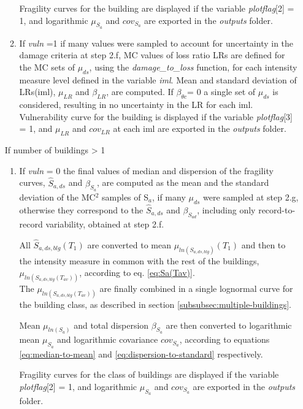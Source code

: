 \begin{enumerate}
\begin{enumerate}
Fragility curves for the building are displayed if the variable \textit{plotflag}[2] = 1, and logarithmic $\mu_{S_a}$ and $cov_{S_a}$ are exported in the \textit{outputs} folder.

\item 
If \textit{vuln} =1
if many values were sampled to account for uncertainty in the damage criteria at step 2.f, MC values of loss ratio LRs are defined for the MC sets of $\mu_{ds}$, using the \textit{damage\_to\_loss} function, for each intensity measure level defined in the variable \textit{iml}. Mean and standard deviation of LRs(iml), $\mu_{LR}$ and $\beta_{LR}$, are computed. If $\beta_{\theta c}$= 0 a single set of $\mu_{ds}$ is considered, resulting in no uncertainty in the LR for each iml.
Vulnerability curve for the building is displayed if the variable \textit{plotflag}[3] = 1, and $\mu_{LR}$ and $cov_{LR}$ at each iml are exported in the \textit{outputs} folder.\\

\end{enumerate}

If number of buildings > 1\\
\begin{enumerate}
\item If \textit{vuln} = 0
the final values of median and dispersion of the fragility curves, $\hat{S}_{a,ds}$ and $\beta_{S_a}$, are computed as the mean and the standard deviation of the MC$^2$ samples of S$_a$, if many $\mu_{ds}$ were sampled at step 2.g, otherwise they correspond to the $\hat{S}_{a,ds}$ and $\beta_{S_{a d}}$, including only record-to-record variability, obtained at step 2.f.

All $\hat{S}_{a, ds, blg}(T_1)$ are converted to mean $\mu_{ln(S_{a, ds, blg})}(T_1)$ and then to the intensity measure in common with the rest of the buildings, $\mu_{ln(S_{a, ds, blg}(T_{av}))}$, according to eq. \ref{eq:Sa(Tav)}.\\
The $\mu_{ln(S_{a, ds, blg}(T_{av}))}$ are finally combined in a single lognormal curve for the building class, as described in section \ref{subsubsec:multiple-buildings}. 

Mean $\mu_{ln(S_{a})}$ and total dispersion $\beta_{S_a}$ are then converted to logarithmic mean $\mu_{S_a}$ and logarithmic covariance $cov_{S_a}$, according to equations \ref{eq:median-to-mean} and \ref{eq:dispersion-to-standard} respectively.

Fragility curves for the class of buildings are displayed if the variable \textit{plotflag}[2] = 1, and logarithmic $\mu_{S_a}$ and $cov_{S_a}$ are exported in the \textit{outputs} folder.


\end{enumerate}
\end{enumerate}
